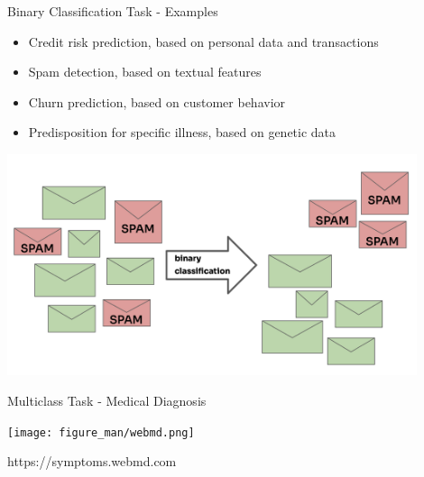 \documentclass[11pt,compress,t,notes=noshow, xcolor=table]{beamer}
\begin{document}
\begin{vbframe}{Binary Classification Task - Examples}

  \begin{itemize}
  \item Credit risk prediction, based on personal data and transactions
  \item Spam detection, based on textual features
  \item Churn prediction, based on customer behavior
  \item Predisposition for specific illness, based on genetic data
\end{itemize}

\begin{center}
  \includegraphics[width=0.9\textwidth]{figure_man/spam.png}
\end{center}
\end{vbframe}



\begin{vbframe}{Multiclass Task - Medical Diagnosis}
\begin{center}
  \texttt{[image: figure\_man/webmd.png]}
\end{center}
\vspace{-0.5cm}
\begin{flushright}
  \tiny https://symptoms.webmd.com
\end{flushright}
\end{vbframe}
\end{document}
